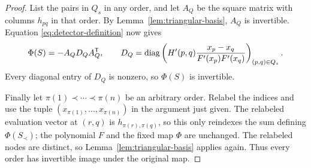 \begin{proof}
List the pairs in $Q_s$ in any order, and let $A_Q$ be the square
matrix with columns $h_{pq}$ in that order.  By
Lemma~\ref{lem:triangular-basis}, $A_Q$ is invertible.  Equation
\eqref{eq:detector-definition} now gives
\begin{equation}
\label{eq:detector-factorization}
  \Phi(S)=-A_Q D_Q A_Q^{\mathsf T},\qquad
  D_Q=\operatorname{diag}\left(
       H'(p,q)\frac{x_p-x_q}{F'(x_p)F'(x_q)}
       \right)_{(p,q)\in Q_s}.
\end{equation}
Every diagonal entry of $D_Q$ is nonzero, so $\Phi(S)$ is invertible.

Finally let $\pi(1)\prec\cdots\prec\pi(n)$ be an arbitrary order.
Relabel the indices and use the tuple
$(x_{\pi(1)},\ldots,x_{\pi(n)})$ in the argument just given.
The relabeled evaluation vector at $(r,q)$ is
$h_{\pi(r),\pi(q)}$, so this only reindexes the sum defining
$\Phi(S_\prec)$; the polynomial $F$ and the fixed map $\Phi$ are
unchanged.  The relabeled nodes are
distinct, so Lemma~\ref{lem:triangular-basis} applies again.
Thus every order has invertible image under the original map.
\end{proof}
